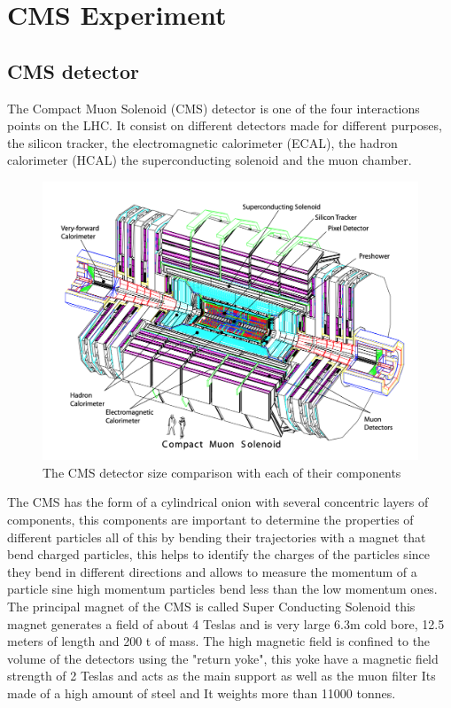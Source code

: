 \chapter{CMS Experiment}
\label{ch2}

\section{CMS detector}

The Compact Muon Solenoid (CMS) detector is one of the four interactions points on the LHC. It consist on different detectors made for different purposes, the silicon tracker, the electromagnetic calorimeter (ECAL), the hadron calorimeter (HCAL) the superconducting solenoid and the muon chamber. 

\begin{figure}[H]
    \centering
     \includegraphics[height=0.73\textwidth, width=1\textwidth]{cms2.png}
     \caption{The CMS detector size comparison with each of their components}
    \label{fig:four-forces}
\end{figure}


The CMS has the form of a cylindrical onion with several concentric layers of components, this components are important to determine the properties of different particles all of this by bending their trajectories with a magnet that bend charged particles, this helps to identify the charges of the particles since they bend in different directions and allows to measure the momentum of a particle sine high momentum particles bend less than the low momentum ones. The principal magnet of the CMS is called Super Conducting Solenoid this magnet generates a field of about 4 Teslas and is very large 6.3m cold bore, 12.5 meters of length and 200 t of mass. The high magnetic field is confined to the volume of the detectors using the "return yoke", this yoke have a magnetic field strength of 2 Teslas and acts as the main support as well as the muon filter Its made of a high amount of steel and It weights more than 11000 tonnes.     \cite{CMS3}

